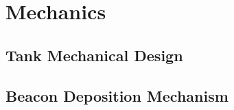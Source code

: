 \section{Mechanics}\label{sec:mechanics}
\subsection{Tank Mechanical Design}
\todo{}
\subsection{Beacon Deposition Mechanism}
\todo{}
